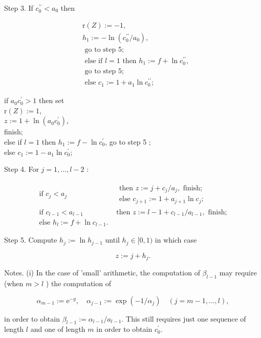 \documentclass[10pt]{article}
\begin{document}
Step 3. If $c_{0}^{\prime \prime}<a_{0}$ then

$$
\begin{aligned}
& \mathrm{r}(Z):=-1, \\
& h_{1}:=-\ln \left(c_{0}^{\prime \prime} / a_{0}\right), \\
& \text { go to step } 5 ; \\
& \text { else if } l=1 \text { then } h_{1}:=f+\ln c_{0}^{\prime \prime}, \\
& \text { go to step } 5 ; \\
& \text { else } c_{1}:=1+a_{1} \ln c_{0}^{\prime \prime} ;
\end{aligned}
$$

if $a_{0} c_{0}^{\prime}>1$ then set\\
$\mathrm{r}(Z):=1$,\\
$z:=1+\ln \left(a_{0} c_{0}^{\prime}\right)$,\\
finish;\\
else if $l=1$ then $h_{1}:=f-\ln c_{0}^{\prime}$, go to step 5 ;\\
else $c_{1}:=1-a_{1} \ln c_{0}^{\prime}$;

Step 4. For $j=1, \ldots, l-2$ :

$$
\begin{array}{cc}
\text { if } c_{j}<a_{j} & \begin{array}{c}
\text { then } z:=j+c_{j} / a_{j}, \text { finish; } \\
\text { else } c_{j+1}:=1+a_{j+1} \ln c_{j} ;
\end{array} \\
\text { if } c_{l-1}<a_{l-1} & \text { then } z:=l-1+c_{l-1} / a_{l-1}, \text { finish; } \\
\text { else } h_{l}:=f+\ln c_{l-1} .
\end{array}
$$

Step 5. Compute $h_{j}:=\ln h_{j-1}$ until $h_{j} \in[0,1)$ in which case

$$
z:=j+h_{j} .
$$

Notes. (i) In the case of 'small' arithmetic, the computation of $\beta_{l-1}$ may require (when $m>l$ ) the computation of

$$
\alpha_{m-1}:=\mathrm{e}^{-g}, \quad \alpha_{j-1}:=\exp \left(-1 / \alpha_{j}\right) \quad(j=m-1, \ldots, l),
$$

in order to obtain $\beta_{l-1}:=\alpha_{l-1} / a_{l-1}$. This still requires just one sequence of length $l$ and one of length $m$ in order to obtain $c_{0}^{\prime}$.
\end{document}
